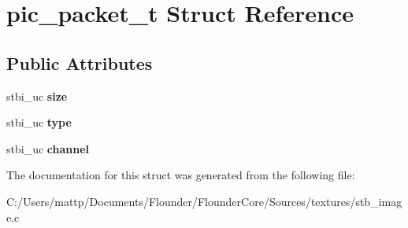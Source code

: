 \hypertarget{structpic__packet__t}{}\section{pic\+\_\+packet\+\_\+t Struct Reference}
\label{structpic__packet__t}
\subsection*{Public Attributes}
\begin{DoxyCompactItemize}
\item 
\mbox{\label{structpic__packet__t_ad33021e40c272a20d89bdcceabb20a71}} 
stbi\+\_\+uc {\bfseries size}
\item 
\mbox{\label{structpic__packet__t_abc346cfdcff43f051830335296f14aaa}} 
stbi\+\_\+uc {\bfseries type}
\item 
\mbox{\label{structpic__packet__t_af64f17c991495f3f3baf6782a253f7cc}} 
stbi\+\_\+uc {\bfseries channel}
\end{DoxyCompactItemize}


The documentation for this struct was generated from the following file\+:\begin{DoxyCompactItemize}
\item 
C\+:/\+Users/mattp/\+Documents/\+Flounder/\+Flounder\+Core/\+Sources/textures/stb\+\_\+image.\+c\end{DoxyCompactItemize}
